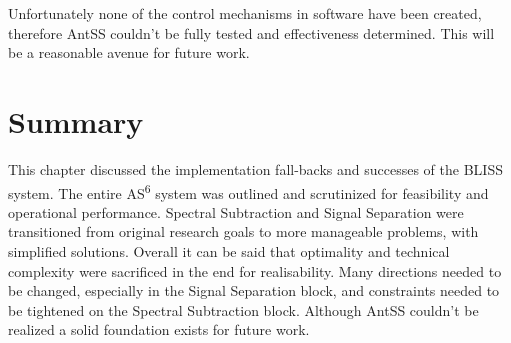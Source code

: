Unfortunately none of the control mechanisms in software have been created, therefore AntSS couldn't be fully tested and effectiveness determined.  This will be a reasonable avenue for future work.\\

\section{Summary}

This chapter discussed the implementation fall-backs and successes of the BLISS system.  The entire AS\textsuperscript{6} system was outlined and scrutinized for feasibility and operational performance.  Spectral Subtraction and Signal Separation were transitioned from original research goals to more manageable problems, with simplified solutions.  Overall it can be said that optimality and technical complexity were sacrificed in the end for realisability.  Many directions needed to be changed, especially in the Signal Separation block, and constraints needed to be tightened on the Spectral Subtraction block.  Although AntSS couldn't be realized a solid foundation exists for future work.\\ 




